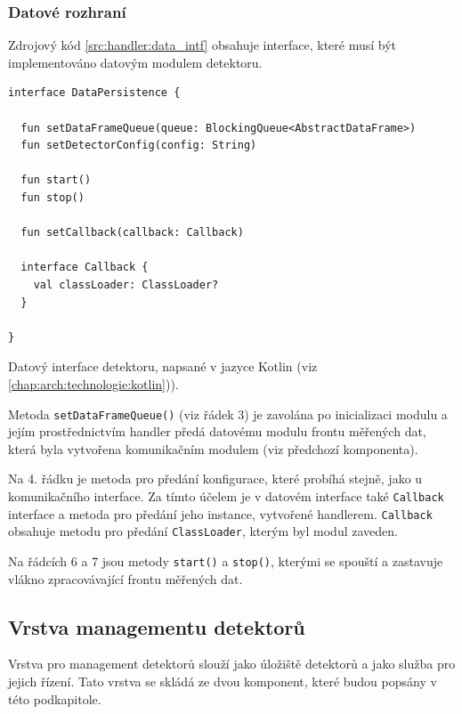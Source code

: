 \subsubsection{Datové rozhraní}\label{chap:handler:detector_layer:dataIntf}
Zdrojový kód \ref{src:handler:data_intf} obsahuje interface, které musí být implementováno datovým modulem detektoru.

\begin{code}[h!]
\begin{verbatim}
interface DataPersistence {

  fun setDataFrameQueue(queue: BlockingQueue<AbstractDataFrame>)
  fun setDetectorConfig(config: String)

  fun start()
  fun stop()

  fun setCallback(callback: Callback)

  interface Callback {
    val classLoader: ClassLoader?
  }

}
\end{verbatim}
\caption{Datový interface detektoru, napsané v jazyce Kotlin (viz \ref{chap:arch:technologie:kotlin})).}
\label{src:handler:data_intf}
\end{code}

Metoda \texttt{setDataFrameQueue()} (viz řádek 3) je zavolána po inicializaci modulu a jejím prostřednictvím handler předá datovému modulu frontu měřených dat, která byla vytvořena komunikačním modulem (viz předchozí komponenta).

Na 4. řádku je metoda pro předání konfigurace, které probíhá stejně, jako u komunikačního interface. Za tímto účelem je v datovém interface také \texttt{Callback} interface a metoda pro předání jeho instance, vytvořené handlerem. \texttt{Callback} obsahuje metodu pro předání \texttt{ClassLoader}, kterým byl modul zaveden.

Na řádcích 6 a 7 jsou metody \texttt{start()} a \texttt{stop()}, kterými se spouští a zastavuje vlákno zpracovávající frontu měřených dat.

\subsection{Vrstva managementu detektorů}\label{chap:handler:detectors_layer}
Vrstva pro management detektorů slouží jako úložiště detektorů a jako služba pro jejich řízení. Tato vrstva se skládá ze dvou komponent, které budou popsány v této podkapitole.

